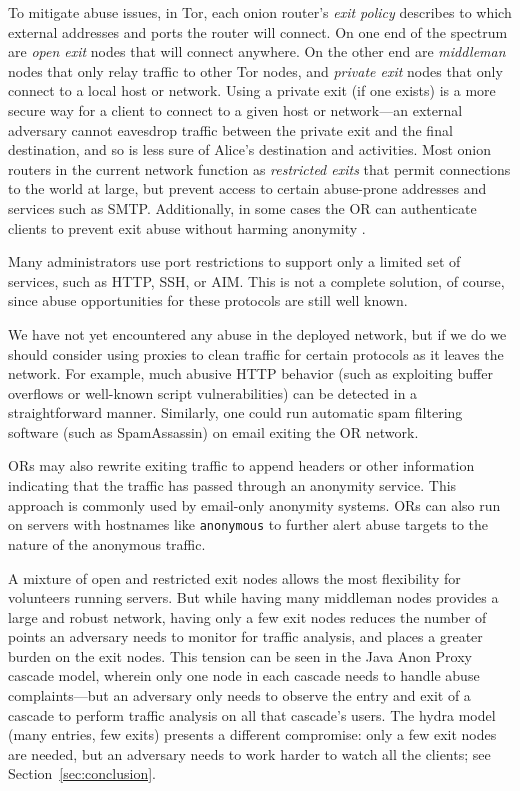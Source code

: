 \documentclass[times,10pt,twocolumn]{article}
\begin{document}
To mitigate abuse issues, in Tor, each onion router's \emph{exit policy}
describes to which external addresses and ports the router will
connect. On one end of the spectrum are \emph{open exit}
nodes that will connect anywhere. On the other end are \emph{middleman}
nodes that only relay traffic to other Tor nodes, and \emph{private exit}
nodes that only connect to a local host or network.  Using a private
exit (if one exists) is a more secure way for a client to connect to a
given host or network---an external adversary cannot eavesdrop traffic
between the private exit and the final destination, and so is less sure of
Alice's destination and activities. Most onion routers in the current
network function as
\emph{restricted exits} that permit connections to the world at large,
but prevent access to certain abuse-prone addresses and services such
as SMTP.
Additionally, in some cases the OR can authenticate clients to
prevent exit abuse without harming anonymity \cite{or-discex00}.


Many administrators use port restrictions to support only a
limited set of services, such as HTTP, SSH, or AIM.
This is not a complete solution, of course, since abuse opportunities for these
protocols are still well known.

We have not yet encountered any abuse in the deployed network, but if
we do we should consider using proxies to clean traffic for certain
protocols as it leaves the network.  For example, much abusive HTTP
behavior (such as exploiting buffer overflows or well-known script
vulnerabilities) can be detected in a straightforward manner.
Similarly, one could run automatic spam filtering software (such as
SpamAssassin) on email exiting the OR network.

ORs may also rewrite exiting traffic to append
headers or other information indicating that the traffic has passed
through an anonymity service.  This approach is commonly used
by email-only anonymity systems.  ORs can also
run on servers with hostnames like {\tt anonymous} to further
alert abuse targets to the nature of the anonymous traffic.

A mixture of open and restricted exit nodes allows the most
flexibility for volunteers running servers. But while having many
middleman nodes provides a large and robust network,
having only a few exit nodes reduces the number of points
an adversary needs to monitor for traffic analysis, and places a
greater burden on the exit nodes.  This tension can be seen in the
Java Anon Proxy
cascade model, wherein only one node in each cascade needs to handle
abuse complaints---but an adversary only needs to observe the entry
and exit of a cascade to perform traffic analysis on all that
cascade's users. The hydra model (many entries, few exits) presents a
different compromise: only a few exit nodes are needed, but an
adversary needs to work harder to watch all the clients; see
Section~\ref{sec:conclusion}.
\end{document}
